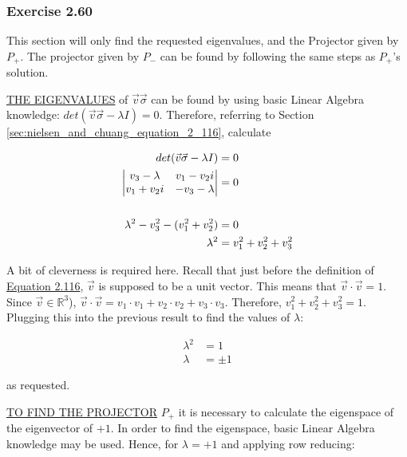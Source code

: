 \subsubsection{Exercise 2.60}
\label{sec:nielsen_and_chuang_exercise_2_60}
This section will only find the requested eigenvalues,
and the Projector given by $P_+$.
The projector given by $P_-$ can be found by following the same
steps as $P_+$'s solution.

\MakeUppercase{\underline{The eigenvalues}} of
$\vec{v} \vec{\sigma}$ can be found by using
basic Linear Algebra knowledge:
$det(\vec{v} \vec{\sigma} - \lambda I) = 0$.
Therefore, referring to Section \ref{sec:nielsen_and_chuang_equation_2_116},
calculate

\begin{align}
    det(\vec{v} \vec{\sigma} - \lambda I) &= 0 \\
    \left| \begin{matrix}
        v_3 - \lambda & v_1 - v_2i \\ v_1 + v_2i & -v_3 - \lambda
        \end{matrix} \right| &= 0 \\
    \notag \\
    \lambda^2 - v_3^2 - (v_1^2 + v_2^2) &= 0 \\
    \lambda^2 &= v_1^2 + v_2^2 + v_3^2
\end{align}

A bit of cleverness is required here.
Recall that just before the definition of
\href{sec:nielsen_and_chuang_equation_2_116}{Equation 2.116},
$\vec{v}$ is supposed to be a unit vector.
This means that $\vec{v} \cdot \vec{v} = 1$.
Since $\vec{v} \in \mathbb{R}^3$),
$\vec{v} \cdot \vec{v} = v_1 \cdot v_1 +
v_2 \cdot v_2 + v_3 \cdot v_3$.
Therefore, $v_1^2 + v_2^2 + v_3^2 = 1$.
Plugging this into the previous result to find the values of $\lambda$:

\begin{align}
    \lambda^2 &= 1 \\
    \lambda &= \pm 1
\end{align}

as requested.

\MakeUppercase{\underline{To find the Projector}} $P_+$ it is necessary to
calculate the eigenspace of the eigenvector of $+1$.
In order to find the eigenspace, basic Linear Algebra knowledge may be used.
Hence, for $\lambda = +1$ and applying row reducing:

